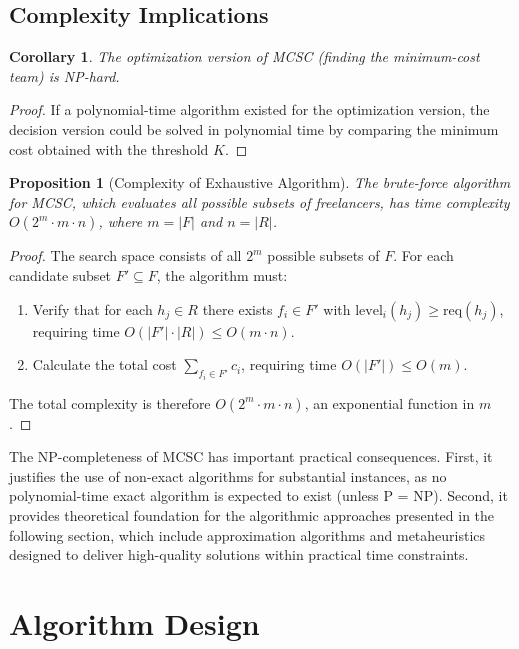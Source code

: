 \documentclass[12pt,a4paper]{article}
\newtheorem{proposition}{Proposition}[section]
\newtheorem{corollary}{Corollary}[section]
\newtheorem{proof}{Proof}
\begin{document}
\subsection{Complexity Implications}
\label{subsec:complexity-implications}

\begin{corollary}
	The optimization version of MCSC (finding the minimum-cost team) is NP-hard.
\end{corollary}

\begin{proof}
	If a polynomial-time algorithm existed for the optimization version, the decision version could be solved in polynomial time by comparing the minimum cost obtained with the threshold $K$.
\end{proof}

\begin{proposition}[Complexity of Exhaustive Algorithm]
	The brute-force algorithm for MCSC, which evaluates all possible subsets of freelancers, has time complexity $O(2^m \cdot m \cdot n)$, where $m = |F|$ and $n = |R|$.
\end{proposition}

\begin{proof}
	The search space consists of all $2^m$ possible subsets of $F$. For each candidate subset $F' \subseteq F$, the algorithm must:
	\begin{enumerate}
		\item Verify that for each $h_j \in R$ there exists $f_i \in F'$ with $\text{level}_i(h_j) \geq \text{req}(h_j)$, requiring time $O(|F'| \cdot |R|) \leq O(m \cdot n)$.
		\item Calculate the total cost $\sum_{f_i \in F'} c_i$, requiring time $O(|F'|) \leq O(m)$.
	\end{enumerate}
	The total complexity is therefore $O(2^m \cdot m \cdot n)$, an exponential function in $m$.
\end{proof}

The NP-completeness of MCSC has important practical consequences. First, it justifies the use of non-exact algorithms for substantial instances, as no polynomial-time exact algorithm is expected to exist (unless P = NP). Second, it provides theoretical foundation for the algorithmic approaches presented in the following section, which include approximation algorithms and metaheuristics designed to deliver high-quality solutions within practical time constraints.
	
\section{Algorithm Design}
\label{sec:algorithm-design}
\end{document}
